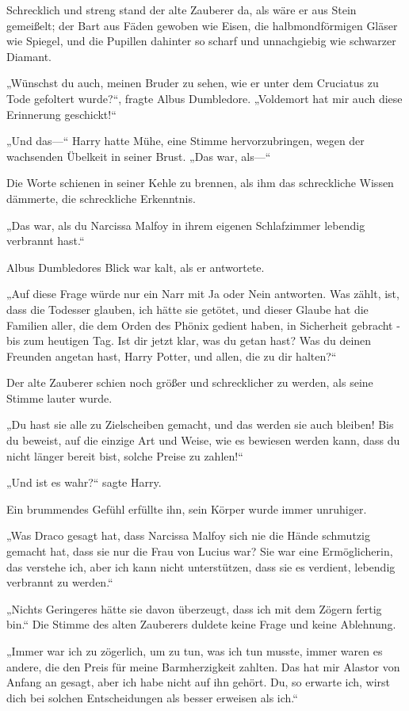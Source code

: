 {Schrecklich und streng stand der alte Zauberer da, als wäre er aus Stein gemeißelt; der Bart aus Fäden gewoben wie Eisen, die halbmondförmigen Gläser wie Spiegel, und die Pupillen dahinter so scharf und unnachgiebig wie schwarzer Diamant.

„Wünschst du auch, meinen Bruder zu sehen, wie er unter dem Cruciatus zu Tode gefoltert wurde?“, fragte Albus Dumbledore. „Voldemort hat mir auch diese Erinnerung geschickt!“

„Und das—“ Harry hatte Mühe, eine Stimme hervorzubringen, wegen der wachsenden Übelkeit in seiner Brust. „Das war, als—“

Die Worte schienen in seiner Kehle zu brennen, als ihm das schreckliche Wissen dämmerte, die schreckliche Erkenntnis.

„Das war, als du Narcissa Malfoy in ihrem eigenen Schlafzimmer lebendig verbrannt hast.“

Albus Dumbledores Blick war kalt, als er antwortete.

„Auf diese Frage würde nur ein Narr mit Ja oder Nein antworten. Was zählt, ist, dass die Todesser glauben, ich hätte sie getötet, und dieser Glaube hat die Familien aller, die dem Orden des Phönix gedient haben, in Sicherheit gebracht - bis zum heutigen Tag. Ist dir jetzt klar, was du getan hast? Was du deinen Freunden angetan hast, Harry Potter, und allen, die zu dir halten?“

Der alte Zauberer schien noch größer und schrecklicher zu werden, als seine Stimme lauter wurde.

„Du hast sie alle zu Zielscheiben gemacht, und das werden sie auch bleiben! Bis du beweist, auf die einzige Art und Weise, wie es bewiesen werden kann, dass du nicht länger bereit bist, solche Preise zu zahlen!“

„Und ist es wahr?“ sagte Harry.

Ein brummendes Gefühl erfüllte ihn, sein Körper wurde immer unruhiger.

„Was Draco gesagt hat, dass Narcissa Malfoy sich nie die Hände schmutzig gemacht hat, dass sie nur die Frau von Lucius war? Sie war eine Ermöglicherin, das verstehe ich, aber ich kann nicht unterstützen, dass sie es verdient, lebendig verbrannt zu werden.“

„Nichts Geringeres hätte sie davon überzeugt, dass ich mit dem Zögern fertig bin.“ Die Stimme des alten Zauberers duldete keine Frage und keine Ablehnung.

„Immer war ich zu zögerlich, um zu tun, was ich tun musste, immer waren es andere, die den Preis für meine Barmherzigkeit zahlten. Das hat mir Alastor von Anfang an gesagt, aber ich habe nicht auf ihn gehört. Du, so erwarte ich, wirst dich bei solchen Entscheidungen als besser erweisen als ich.“

}
